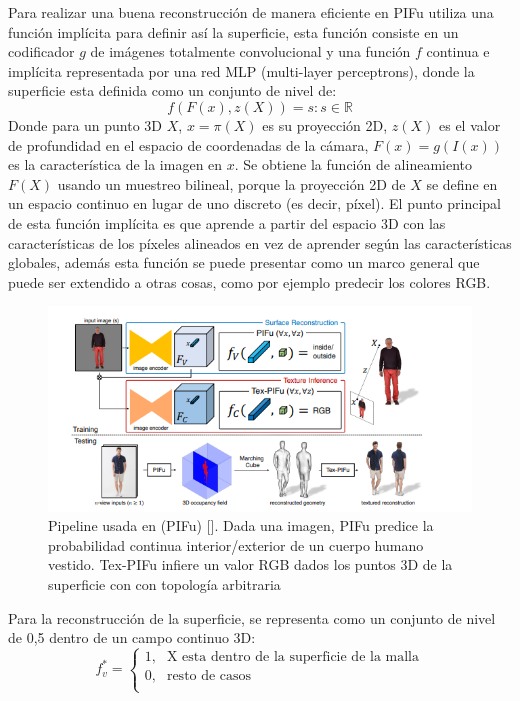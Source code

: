 Para realizar una buena reconstrucción de manera eficiente en PIFu utiliza una función implícita para definir así la superficie, esta función consiste en un codificador $g$ de imágenes totalmente convolucional y una función $f$ continua e implícita representada por una red MLP (multi-layer perceptrons), donde la superficie esta definida como un conjunto de nivel de:
\begin{equation}
	\label{eq:1}
	f(F(x), z(X)) = s : s \in \mathbb{R}
\end{equation}
Donde para un punto 3D $X$, $x = \pi(X)$ es su proyección 2D, $z(X)$ es el valor de profundidad en el espacio de coordenadas de la cámara, $F(x) = g(I(x))$ es la característica de la imagen en $x$. Se obtiene la función de alineamiento $F(X)$ usando un muestreo bilineal, porque la proyección 2D de $X$ se define en un espacio continuo en lugar de uno discreto (es decir, píxel).
El punto principal de esta función implícita es que aprende a partir del espacio 3D con las características de los píxeles alineados en vez de aprender según las características globales, además esta función se puede presentar como un marco general que puede ser extendido a otras cosas, como por ejemplo predecir los colores RGB.


\begin{figure}[H]
	\centering
	\includegraphics[scale=0.7]{imagenes/antecedentes2.png}
	\caption{Pipeline usada en (PIFu) [\cite{pifu}]. Dada una imagen, PIFu predice la probabilidad continua interior/exterior de un cuerpo humano vestido. Tex-PIFu infiere un valor RGB dados los puntos 3D de la superficie con  con topología arbitraria}
	\label{fig:figura8}
\end{figure}

 Para la reconstrucción de la superficie, se representa como un conjunto de nivel de 0,5 dentro de un campo continuo 3D:
 \begin{equation}
 	\label{eq:2}
 	f_{v}^{*} = \begin{cases}
 				1\text{,}  & \text{X esta dentro de la superficie de la malla}\\
 				0\text{,}  & \text{resto de casos}\\
 			\end{cases}
 \end{equation}

